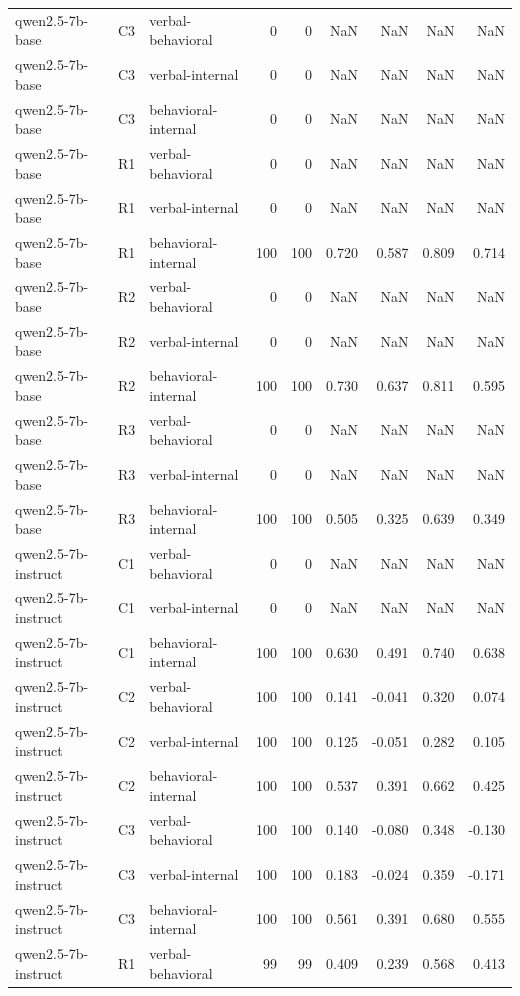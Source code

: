 \begin{table}
\begin{tabular}{lllrrrrrr}
qwen2.5-7b-base & C3 & verbal-behavioral & 0 & 0 & NaN & NaN & NaN & NaN \\
qwen2.5-7b-base & C3 & verbal-internal & 0 & 0 & NaN & NaN & NaN & NaN \\
qwen2.5-7b-base & C3 & behavioral-internal & 0 & 0 & NaN & NaN & NaN & NaN \\
qwen2.5-7b-base & R1 & verbal-behavioral & 0 & 0 & NaN & NaN & NaN & NaN \\
qwen2.5-7b-base & R1 & verbal-internal & 0 & 0 & NaN & NaN & NaN & NaN \\
qwen2.5-7b-base & R1 & behavioral-internal & 100 & 100 & 0.720 & 0.587 & 0.809 & 0.714 \\
qwen2.5-7b-base & R2 & verbal-behavioral & 0 & 0 & NaN & NaN & NaN & NaN \\
qwen2.5-7b-base & R2 & verbal-internal & 0 & 0 & NaN & NaN & NaN & NaN \\
qwen2.5-7b-base & R2 & behavioral-internal & 100 & 100 & 0.730 & 0.637 & 0.811 & 0.595 \\
qwen2.5-7b-base & R3 & verbal-behavioral & 0 & 0 & NaN & NaN & NaN & NaN \\
qwen2.5-7b-base & R3 & verbal-internal & 0 & 0 & NaN & NaN & NaN & NaN \\
qwen2.5-7b-base & R3 & behavioral-internal & 100 & 100 & 0.505 & 0.325 & 0.639 & 0.349 \\
qwen2.5-7b-instruct & C1 & verbal-behavioral & 0 & 0 & NaN & NaN & NaN & NaN \\
qwen2.5-7b-instruct & C1 & verbal-internal & 0 & 0 & NaN & NaN & NaN & NaN \\
qwen2.5-7b-instruct & C1 & behavioral-internal & 100 & 100 & 0.630 & 0.491 & 0.740 & 0.638 \\
qwen2.5-7b-instruct & C2 & verbal-behavioral & 100 & 100 & 0.141 & -0.041 & 0.320 & 0.074 \\
qwen2.5-7b-instruct & C2 & verbal-internal & 100 & 100 & 0.125 & -0.051 & 0.282 & 0.105 \\
qwen2.5-7b-instruct & C2 & behavioral-internal & 100 & 100 & 0.537 & 0.391 & 0.662 & 0.425 \\
qwen2.5-7b-instruct & C3 & verbal-behavioral & 100 & 100 & 0.140 & -0.080 & 0.348 & -0.130 \\
qwen2.5-7b-instruct & C3 & verbal-internal & 100 & 100 & 0.183 & -0.024 & 0.359 & -0.171 \\
qwen2.5-7b-instruct & C3 & behavioral-internal & 100 & 100 & 0.561 & 0.391 & 0.680 & 0.555 \\
qwen2.5-7b-instruct & R1 & verbal-behavioral & 99 & 99 & 0.409 & 0.239 & 0.568 & 0.413 \\

\end{tabular}
\end{table}
